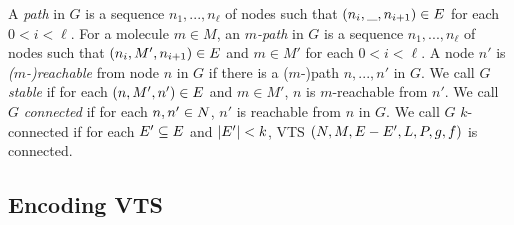 %

A {\em path} in $G$ is a sequence $n_1,...,n_\ell$ of nodes 
such that $(n_i,\_,n_{i+1}) \in E$ for each $ 0 < i < \ell$.
%
For a molecule $m \in M$,
an {\em $m$-path} in $G$ is a sequence $n_1,...,n_\ell$ of nodes 
such that $(n_i,M',n_{i+1}) \in E$ and $m \in M'$ for
each $ 0 < i < \ell$.
%
A node $n'$ is {\em ($m$-)reachable} from node $n$ in $G$ if there is a ($m$-)path
$n,...,n'$ in $G$.
%
%
We call $G$ {\em stable} if for each $(n,M',n') \in E$ and $m \in M'$,
$n$ is $m$-reachable from $n'$.
%
We call $G$ {\em connected} if for each $n,n' \in N$,
$n'$ is reachable from $n$ in $G$.
%
We call $G$ $k$-connected if for each $E' \subseteq E$ and $|E'| < k$,
VTS $(N,M,E-E',L,P,g,f)$ is connected.



%


\subsection{Encoding VTS}

